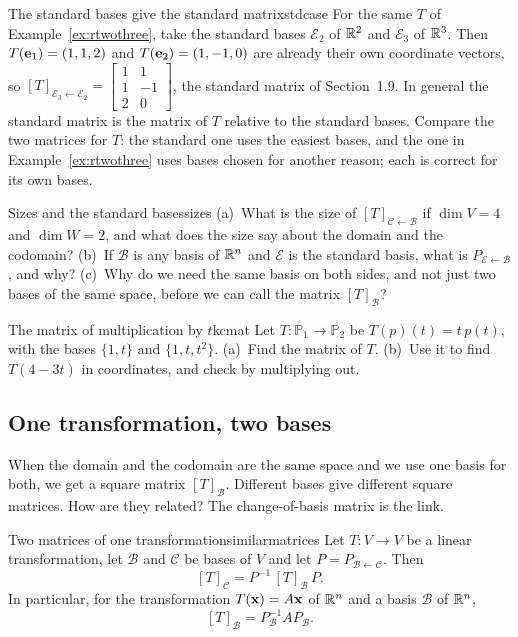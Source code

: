 \documentclass[11pt]{article}
\begin{document}
\begin{exmp}{The standard bases give the standard matrix}{stdcase}
For the same $T$ of Example~\ref{ex:rtwothree}, take the standard bases $\mathcal{E}_2$ of $\mathbb{R}^2$ and $\mathcal{E}_3$ of $\mathbb{R}^3$. Then $T(\mathbf{e}_1)=(1,1,2)$ and $T(\mathbf{e}_2)=(1,-1,0)$ are already their own coordinate vectors, so $[T]_{\mathcal{E}_3\leftarrow\mathcal{E}_2}=\begin{bmatrix}1&1\\1&-1\\2&0\end{bmatrix}$, the standard matrix of Section~1.9. In general the standard matrix is the matrix of $T$ relative to the standard bases. Compare the two matrices for $T$: the standard one uses the easiest bases, and the one in Example~\ref{ex:rtwothree} uses bases chosen for another reason; each is correct for its own bases.
\end{exmp}

\begin{think}{Sizes and the standard bases}{sizes}
(a)~What is the size of $[T]_{\mathcal{C}\leftarrow\mathcal{B}}$ if $\dim V=4$ and $\dim W=2$, and what does the size say about the domain and the codomain? (b)~If $\mathcal{B}$ is any basis of $\mathbb{R}^n$ and $\mathcal{E}$ is the standard basis, what is $P_{\mathcal{E}\leftarrow\mathcal{B}}$, and why? (c)~Why do we need the same basis on both sides, and not just two bases of the same space, before we can call the matrix $[T]_{\mathcal{B}}$?
\end{think}

\begin{kc}{The matrix of multiplication by $t$}{kcmat}
Let $T:\mathbb{P}_1\to\mathbb{P}_2$ be $T(p)(t)=t\,p(t)$, with the bases $\{1,t\}$ and $\{1,t,t^2\}$. (a)~Find the matrix of $T$. (b)~Use it to find $T(4-3t)$ in coordinates, and check by multiplying out.
\end{kc}

\subsection*{One transformation, two bases}

When the domain and the codomain are the same space and we use one basis for both, we get a square matrix $[T]_{\mathcal{B}}$. Different bases give different square matrices. How are they related? The change-of-basis matrix is the link.

\begin{thm}{Two matrices of one transformation}{similarmatrices}
Let $T:V\to V$ be a linear transformation, let $\mathcal{B}$ and $\mathcal{C}$ be bases of $V$ and let $P=P_{\mathcal{B}\leftarrow\mathcal{C}}$. Then
\[
[T]_{\mathcal{C}}=P^{-1}\,[T]_{\mathcal{B}}\,P.
\]
In particular, for the transformation $T(\mathbf{x})=A\mathbf{x}$ of $\mathbb{R}^n$ and a basis $\mathcal{B}$ of $\mathbb{R}^n$,
\[
[T]_{\mathcal{B}}=P_{\mathcal{B}}^{-1}AP_{\mathcal{B}}.
\]
\end{thm}
\end{document}
